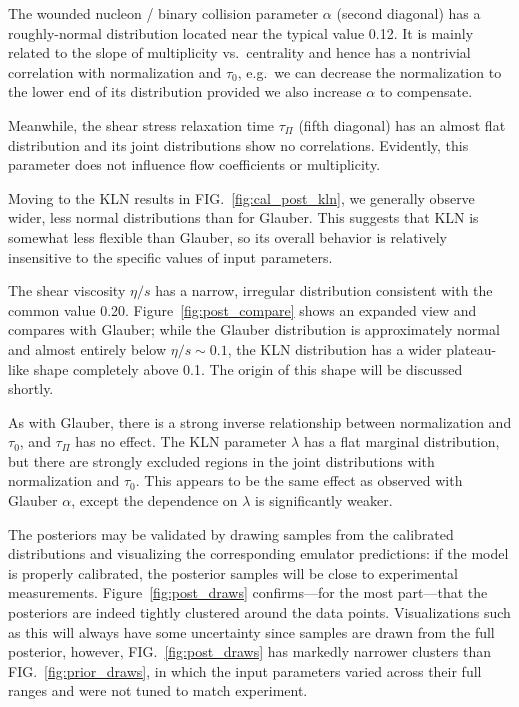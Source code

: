 \documentclass[aps,prc,reprint,superscriptaddress,amsmath]{revtex4-1}
\begin{document}
The wounded nucleon / binary collision parameter $\alpha$ (second diagonal) has a roughly-normal distribution located near the typical value 0.12.
It is mainly related to the slope of multiplicity vs.\ centrality and hence has a nontrivial correlation with normalization and $\tau_0$, e.g.\ we can decrease the normalization to the lower end of its distribution provided we also increase $\alpha$ to compensate.

Meanwhile, the shear stress relaxation time $\tau_\Pi$ (fifth diagonal) has an almost flat distribution and its joint distributions show no correlations.
Evidently, this parameter does not influence flow coefficients or multiplicity.

Moving to the KLN results in FIG.~\ref{fig:cal_post_kln}, we generally observe wider, less normal distributions than for Glauber.
This suggests that KLN is somewhat less flexible than Glauber, so its overall behavior is relatively insensitive to the specific values of input parameters.

The shear viscosity $\eta/s$ has a narrow, irregular distribution consistent with the common value 0.20.
Figure~\ref{fig:post_compare} shows an expanded view and compares with Glauber;
while the Glauber distribution is approximately normal and almost entirely below $\eta/s \sim 0.1$, the KLN distribution has a wider plateau-like shape completely above 0.1.
The origin of this shape will be discussed shortly.

As with Glauber, there is a strong inverse relationship between normalization and $\tau_0$, and $\tau_\Pi$ has no effect.
The KLN parameter $\lambda$ has a flat marginal distribution, but there are strongly excluded regions in the joint distributions with normalization and $\tau_0$.
This appears to be the same effect as observed with Glauber $\alpha$, except the dependence on $\lambda$ is significantly weaker.

The posteriors may be validated by drawing samples from the calibrated distributions and visualizing the corresponding emulator predictions:
if the model is properly calibrated, the posterior samples will be close to experimental measurements.
Figure~\ref{fig:post_draws} confirms---for the most part---that the posteriors are indeed tightly clustered around the data points.
Visualizations such as this will always have some uncertainty since samples are drawn from the full posterior, however, FIG.~\ref{fig:post_draws} has markedly narrower clusters than FIG.~\ref{fig:prior_draws}, in which the input parameters varied across their full ranges and were not tuned to match experiment.
\end{document}
